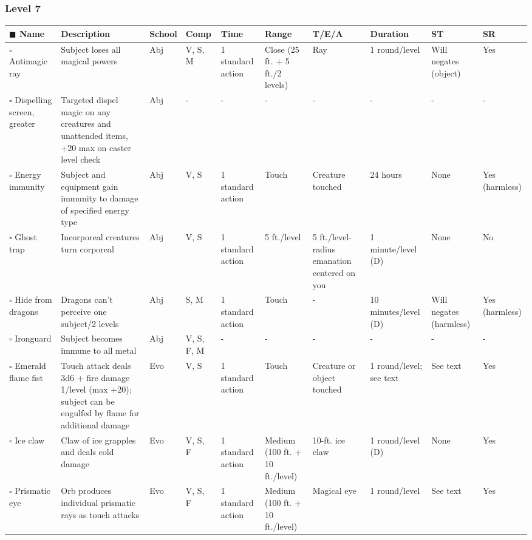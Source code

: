 \documentclass[12pt, a4paper]{article}
\begin{document}
\begin{center}
  \subsubsection*{Level 7}
  \begin{longtable}[H]{ p{8em} p{15em} p{2em} p{5em} p{6em} p{6em} p{10em} p{6em} p{5em} p{2em} }
    \(\blacksquare\) \textbf{Name} & \textbf{Description} & \textbf{School} & \textbf{Comp} & \textbf{Time} & \textbf{Range} & \textbf{T/E/A} & \textbf{Duration} & \textbf{ST} & \textbf{SR}\\
    \endhead
    \(\square\) Antimagic ray & Subject loses all magical powers & Abj & V, S, M & 1 standard action & Close (25 ft. + 5 ft./2 levels) & Ray & 1 round/level & Will negates (object) & Yes\\
    \(\square\) Dispelling screen, greater & Targeted dispel magic on any creatures and unattended items, +20 max on caster level check & Abj & - & - & - & - & - & - & -\\
    \(\square\) Energy immunity & Subject and equipment gain immunity to damage of speciﬁed energy type & Abj & V, S & 1 standard action & Touch & Creature touched & 24 hours & None & Yes (harmless)\\
    \(\square\) Ghost trap & Incorporeal creatures turn corporeal & Abj & V, S & 1 standard action & 5 ft./level & 5 ft./level-radius emanation centered on you & 1 minute/level (D) & None & No\\
    \(\square\) Hide from dragons & Dragons can’t perceive one subject/2 levels & Abj & S, M & 1 standard action & Touch & - & 10 minutes/level (D) & Will negates (harmless) & Yes (harmless)\\
    \(\square\) Ironguard & Subject becomes immune to all metal & Abj & V, S, F, M & - & - & - & - & - & -\\
    \(\square\) Emerald flame fist & Touch attack deals 3d6 + ﬁre damage 1/level (max +20); subject can be engulfed by ﬂame for additional damage & Evo & V, S & 1 standard action & Touch & Creature or object touched & 1 round/level; see text & See text & Yes\\
    \(\square\) Ice claw & Claw of ice grapples and deals cold damage & Evo & V, S, F & 1 standard action & Medium (100 ft. + 10 ft./level) & 10-ft. ice claw & 1 round/level (D) & None & Yes\\
    \(\square\) Prismatic eye & Orb produces individual prismatic rays as touch attacks & Evo & V, S, F & 1 standard action & Medium (100 ft. + 10 ft./level) & Magical eye & 1 round/level & See text & Yes\\

\end{longtable}
\end{center}
\end{document}
